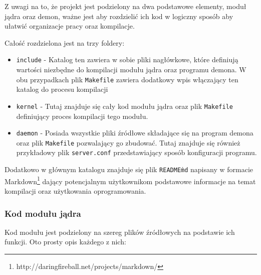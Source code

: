\documentclass[10pt]{scrartcl}
\begin{document}
Z uwagi na to, że projekt jest podzielony na dwa podstawowe elementy, moduł jądra oraz demon, ważne jest aby rozdzielić ich kod w logiczny sposób aby ułatwić organizacje pracy oraz kompilacje.

Całość rozdzielona jest na trzy foldery:

\begin{itemize}
\itemsep1pt\parskip0pt
\item
  \texttt{include} - Katalog ten zawiera w sobie pliki nagłówkowe, które definiują wartości niezbędne do kompilacji modułu jądra oraz programu demona. W obu przypadkach plik \texttt{Makefile} zawiera dodatkowy wpis włączający ten katalog do procesu kompilacji
\item
  \texttt{kernel} - Tutaj znajduje się cały kod modułu jądra oraz plik
  \texttt{Makefile} definiujący proces kompilacji tego modułu.
\item
  \texttt{daemon} - Posiada wszystkie pliki źródłowe składające się na program demona oraz plik \texttt{Makefile} pozwalający go zbudować.  Tutaj znajduje się również przykładowy plik \texttt{server.conf} przedstawiający sposób konfiguracji programu.
\end{itemize}

Dodatkowo w głównym katalogu znajduje się plik \texttt{README\.md} napisany w formacie Markdown\footnote{http://daringfireball.net/projects/markdown/} dający potencjalnym użytkownikom podstawowe informacje na temat kompilacji oraz użytkowania oprogramowania.

\subsubsection{Kod modułu jądra}

Kod modułu jest podzielony na szereg plików źródłowych na podstawie ich funkcji. Oto prosty opis każdego z nich:
\end{document}
